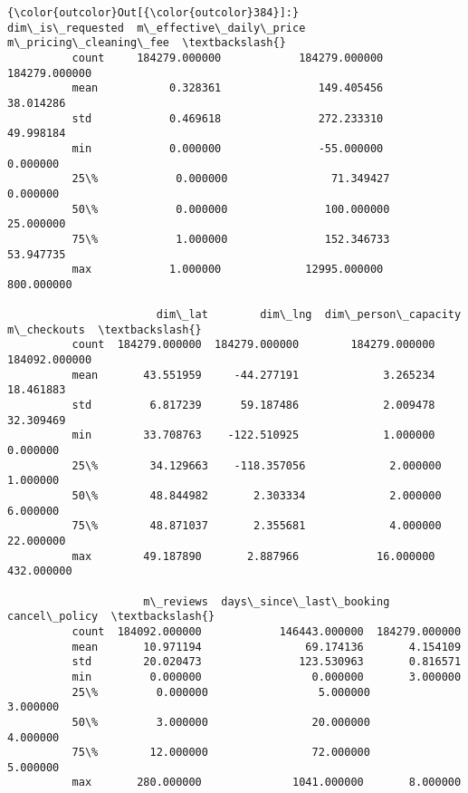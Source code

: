 \documentclass[11pt]{article}
\begin{document}
\begin{Verbatim}[commandchars=\\\{\}]
{\color{outcolor}Out[{\color{outcolor}384}]:}        dim\_is\_requested  m\_effective\_daily\_price  m\_pricing\_cleaning\_fee  \textbackslash{}
          count     184279.000000            184279.000000           184279.000000   
          mean           0.328361               149.405456               38.014286   
          std            0.469618               272.233310               49.998184   
          min            0.000000               -55.000000                0.000000   
          25\%            0.000000                71.349427                0.000000   
          50\%            0.000000               100.000000               25.000000   
          75\%            1.000000               152.346733               53.947735   
          max            1.000000             12995.000000              800.000000   
          
                       dim\_lat        dim\_lng  dim\_person\_capacity    m\_checkouts  \textbackslash{}
          count  184279.000000  184279.000000        184279.000000  184092.000000   
          mean       43.551959     -44.277191             3.265234      18.461883   
          std         6.817239      59.187486             2.009478      32.309469   
          min        33.708763    -122.510925             1.000000       0.000000   
          25\%        34.129663    -118.357056             2.000000       1.000000   
          50\%        48.844982       2.303334             2.000000       6.000000   
          75\%        48.871037       2.355681             4.000000      22.000000   
          max        49.187890       2.887966            16.000000     432.000000   
          
                     m\_reviews  days\_since\_last\_booking  cancel\_policy  \textbackslash{}
          count  184092.000000            146443.000000  184279.000000   
          mean       10.971194                69.174136       4.154109   
          std        20.020473               123.530963       0.816571   
          min         0.000000                 0.000000       3.000000   
          25\%         0.000000                 5.000000       3.000000   
          50\%         3.000000                20.000000       4.000000   
          75\%        12.000000                72.000000       5.000000   
          max       280.000000              1041.000000       8.000000   
          

\end{Verbatim}
\end{document}
